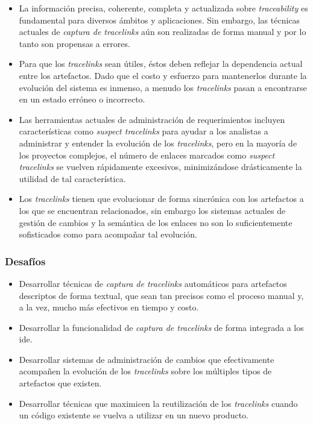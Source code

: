 \documentclass[a4paper,12pt,twoside,spanish,openright]{book}
\begin{document}
\begin{itemize}[label={$\times$}]

\item La información precisa, coherente, completa y actualizada sobre \textit{traceability} es fundamental para diversos ámbitos y aplicaciones. Sin embargo, las técnicas actuales de \textit{captura de tracelinks} aún son realizadas de forma manual y por lo tanto son propensas a errores.

\item Para que los \textit{tracelinks} sean útiles, éstos deben reflejar la dependencia actual entre los artefactos. Dado que el costo y esfuerzo para mantenerlos durante la evolución del sistema es inmenso, a menudo los \textit{tracelinks} pasan a encontrarse en un estado erróneo o incorrecto.

\item Las herramientas actuales de administración de requerimientos incluyen características como \textit{suspect tracelinks} para ayudar a los analistas a administrar y entender la evolución de los \textit{tracelinks}, pero en la mayoría de los proyectos complejos, el número de enlaces marcados como \textit{suspect tracelinks} se vuelven rápidamente excesivos, minimizándose drásticamente la utilidad de tal característica.
 
\item Los \textit{tracelinks} tienen que evolucionar de forma sincrónica con los artefactos a los que se encuentran relacionados, sin embargo los sistemas actuales de gestión de cambios y la semántica de los enlaces no son lo suficientemente sofisticados como para acompañar tal evolución.

\end{itemize}

\subsubsection{Desafíos}

\begin{itemize}[label={\checkmark}]

\item Desarrollar técnicas de \textit{captura de tracelinks} automáticos para artefactos descriptos de forma textual, que sean tan precisos como el proceso manual y, a la vez, mucho más efectivos en tiempo y costo.

\item Desarrollar la funcionalidad de \textit{captura de tracelinks} de forma integrada a los \gls{ide}.

\item Desarrollar sistemas de administración de cambios que efectivamente acompañen la evolución de los \textit{tracelinks} sobre los múltiples tipos de artefactos que existen.

\item Desarrollar técnicas que maximicen la reutilización de los \textit{tracelinks} cuando un código existente se vuelva a utilizar en un nuevo producto.

\end{itemize}
\end{document}
